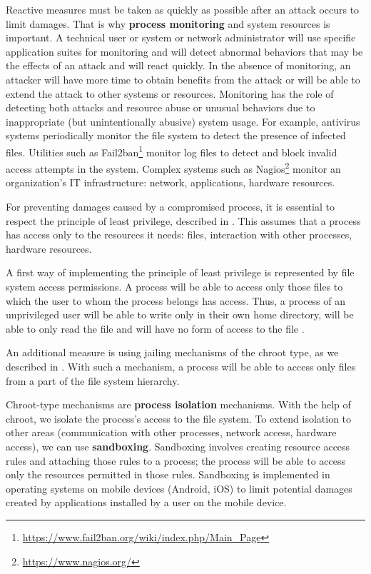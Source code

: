 Reactive measures must be taken as quickly as possible after an attack occurs to limit damages.
That is why \textbf{process monitoring} and system resources is important.
A technical user or system or network administrator will use specific application suites for monitoring and will detect abnormal behaviors that may be the effects of an attack and will react quickly.
In the absence of monitoring, an attacker will have more time to obtain benefits from the attack or will be able to extend the attack to other systems or resources.
Monitoring has the role of detecting both attacks and resource abuse or unusual behaviors due to inappropriate (but unintentionally abusive) system usage.
For example, antivirus systems periodically monitor the file system to detect the presence of infected files.
Utilities such as Fail2ban\footnote{\url{https://www.fail2ban.org/wiki/index.php/Main\_Page}} monitor log files to detect and block invalid access attempts in the system.
Complex systems such as Nagios\footnote{\url{https://www.nagios.org/}} monitor an organization's IT infrastructure: network, applications, hardware resources.

For preventing damages caused by a compromised process, it is essential to respect the principle of least privilege, described in .
This assumes that a process has access only to the resources it needs: files, interaction with other processes, hardware resources.

A first way of implementing the principle of least privilege is represented by file system access permissions.
A process will be able to access only those files to which the user to whom the process belongs has access.
Thus, a process of an unprivileged user will be able to write only in their own home directory, will be able to only read the file  and will have no form of access to the file .

An additional measure is using jailing mechanisms of the chroot type, as we described in .
With such a mechanism, a process will be able to access only files from a part of the file system hierarchy.

Chroot-type mechanisms are \textbf{process isolation} mechanisms.
With the help of chroot, we isolate the process's access to the file system.
To extend isolation to other areas (communication with other processes, network access, hardware access), we can use \textbf{sandboxing}.
Sandboxing involves creating resource access rules and attaching those rules to a process;
the process will be able to access only the resources permitted in those rules.
Sandboxing is implemented in operating systems on mobile devices (Android, iOS) to limit potential damages created by applications installed by a user on the mobile device.

